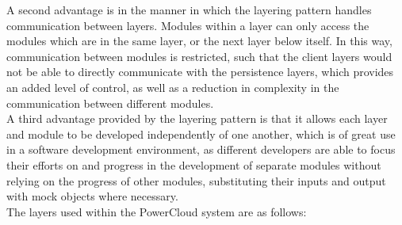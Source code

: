 \documentclass{article}
\begin{document}
A second advantage is in the manner in which the layering pattern handles 
communication between layers. Modules within a layer can only access the 
modules which are in the same layer, or the next layer below itself. In 
this way, communication between modules is restricted, such that the 
client layers would not be able to directly communicate with the 
persistence layers, which provides an added level of control, as well as 
a reduction in complexity in the communication between different 
modules.\\

A third advantage provided by the layering pattern is that it allows each 
layer and module to be developed independently of one another, which is 
of great use in a software development environment, as different 
developers are able to focus their efforts on and progress in the 
development of separate modules without relying on the progress of other 
modules, substituting their inputs and output with mock objects where 
necessary.\\

The layers used within the PowerCloud system are as follows:\\
\end{document}
